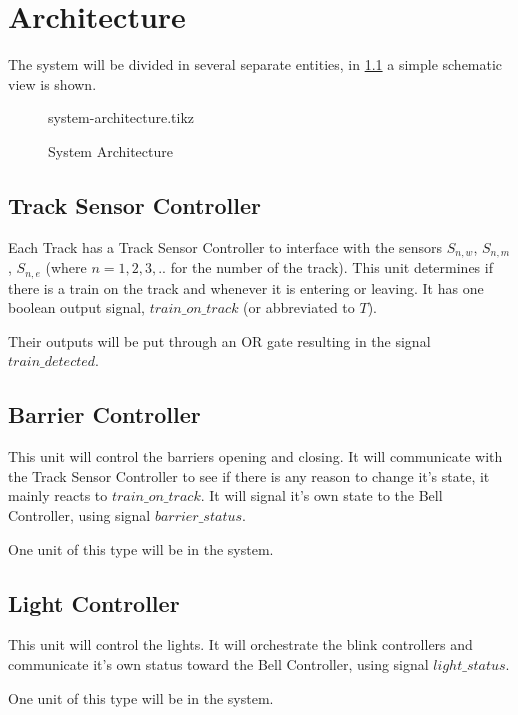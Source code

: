 \documentclass[final]{report}
\begin{document}
\chapter{Architecture}
The system will be divided in several separate entities, in \cref{fig:system-architecture} a simple schematic view is shown.

\begin{figure}[H]
	\centering
	{system-architecture.tikz}
	\caption{System Architecture}
	\label{fig:system-architecture}
\end{figure}

\section{Track Sensor Controller}
Each Track has a Track Sensor Controller to interface with the sensors $S_{n,w}$, $S_{n,m}$, $S_{n,e}$ (where $n = 1,2,3,..$ for the number of the track).
This unit determines if there is a train on the track and whenever it is entering or leaving.
It has one boolean output signal, $train\_on\_track$ (or abbreviated to $T$).

Their outputs will be put through an OR gate resulting in the signal $train\_detected$.

\section{Barrier Controller}
This unit will control the barriers opening and closing.
It will communicate with the Track Sensor Controller to see if there is any reason to change it's state, it mainly reacts to $train\_on\_track$.
It will signal it's own state to the Bell Controller, using signal $barrier\_status$.

One unit of this type will be in the system.

\section{Light Controller}
This unit will control the lights.
It will orchestrate the blink controllers and communicate it's own status toward the Bell Controller, using signal $light\_status$.

One unit of this type will be in the system.

\end{document}
